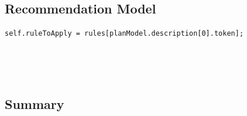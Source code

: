 \subsection{Recommendation Model}
\begin{lstlisting}[caption={}, label={lst:}]
     self.ruleToApply = rules[planModel.description[0].token];
\end{lstlisting}

\begin{lstlisting}[caption={}, label={lst:}]
    
\end{lstlisting}
\begin{lstlisting}[caption={}, label={lst:}]
    
\end{lstlisting}

\subsection{Summary}



